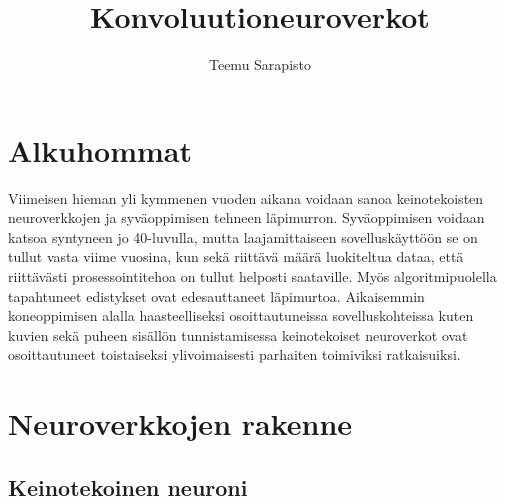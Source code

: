 \documentclass[11pt]{article}
\theoremstyle{plain}
\theoremstyle{definition}
\begin{document}
  \title{Konvoluutioneuroverkot}
  \author{Teemu Sarapisto}
  \maketitle

  \section{Alkuhommat}



  Viimeisen hieman yli kymmenen vuoden aikana voidaan sanoa keinotekoisten neuroverkkojen ja syväoppimisen tehneen läpimurron. Syväoppimisen voidaan katsoa syntyneen jo 40-luvulla, mutta laajamittaiseen sovelluskäyttöön se on tullut vasta viime vuosina, kun sekä riittävä määrä luokiteltua dataa, että riittävästi prosessointitehoa on tullut helposti saataville. Myös algoritmipuolella tapahtuneet edistykset ovat edesauttaneet läpimurtoa. Aikaisemmin koneoppimisen alalla haasteelliseksi osoittautuneissa sovelluskohteissa kuten kuvien sekä puheen sisällön tunnistamisessa keinotekoiset neuroverkot ovat osoittautuneet toistaiseksi ylivoimaisesti parhaiten toimiviksi ratkaisuiksi.\cite{Goodfellow-et-al-2016}

  \section{Neuroverkkojen rakenne}
  \subsection{Keinotekoinen neuroni}
\end{document}
